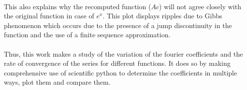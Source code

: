 \documentclass[a4paper, 12pt, margin= 1.25cm ]{article}
\begin{document}
\begin{multicols}{2}
\paragraph{} This also explains why the recomputed function ($Ac$) will
not agree closely with the original function in case of $e^x$. This plot
displays ripples due to Gibbs phenomenon which occurs due to the
presence of a jump discontinuity in the function and the use of a finite
sequence approximation.
\paragraph{} Thus, this work makes a study of the variation of the fourier
coefficients and the rate of convergence of the series for different
functions. It does so by making comprehensive use of scientific python
to determine the coefficients in multiple ways, plot them and compare
them.

\end{multicols}
    
    
    
    
\end{document}
